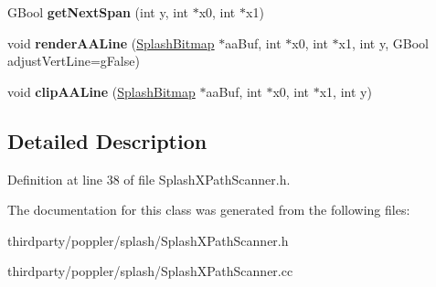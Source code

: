 \begin{DoxyCompactItemize}
\item 
\mbox{\label{class_splash_x_path_scanner_a497cf0b23dcbc0f245decf53841780bc}} 
G\+Bool {\bfseries get\+Next\+Span} (int y, int $\ast$x0, int $\ast$x1)
\item 
\mbox{\label{class_splash_x_path_scanner_a33991db88faec7ded7d54bac277b8b7d}} 
void {\bfseries render\+A\+A\+Line} (\hyperlink{class_splash_bitmap}{Splash\+Bitmap} $\ast$aa\+Buf, int $\ast$x0, int $\ast$x1, int y, G\+Bool adjust\+Vert\+Line=g\+False)
\item 
\mbox{\label{class_splash_x_path_scanner_afaeea0a8c69363fd5eb72b532eede96d}} 
void {\bfseries clip\+A\+A\+Line} (\hyperlink{class_splash_bitmap}{Splash\+Bitmap} $\ast$aa\+Buf, int $\ast$x0, int $\ast$x1, int y)
\end{DoxyCompactItemize}


\subsection{Detailed Description}


Definition at line 38 of file Splash\+X\+Path\+Scanner.\+h.



The documentation for this class was generated from the following files\+:\begin{DoxyCompactItemize}
\item 
thirdparty/poppler/splash/Splash\+X\+Path\+Scanner.\+h\item 
thirdparty/poppler/splash/Splash\+X\+Path\+Scanner.\+cc\end{DoxyCompactItemize}
